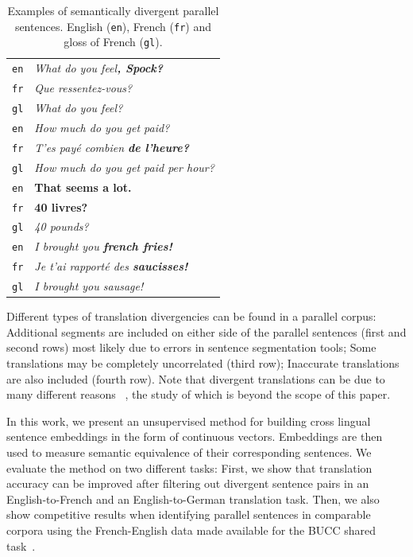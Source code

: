 \documentclass[11pt,a4paper]{article}
\begin{document}
\begin{table}[ht]
\small
\center
\begin{tabular}{ c|l }
  \hline  
  \texttt{en} & \it{What do you feel}\bf{, Spock}\it{?} \\
  \texttt{fr} & \it{Que ressentez-vous?} \\
  \texttt{gl} & {\small \it{What do you feel?}} \\
  \hline
  \texttt{en} & \it{How much do you get paid?} \\
  \texttt{fr} & \it{T'es pay\'e combien} \bf{de l'heure}\it{?} \\
  \texttt{gl} & {\small \it{How much do you get paid per hour?}} \\
  \hline  
  \texttt{en} &  \bf{That seems a lot.} \\
  \texttt{fr} & \bf{40 livres?} \\
  \texttt{gl} & {\small \it{40 pounds?}} \\
  \hline  
  \texttt{en} & \it{I brought you} \bf{french fries}\it{!} \\
  \texttt{fr} & \it{Je t'ai rapport\'e des} \bf{saucisses}\it{!} \\
  \texttt{gl} & {\small \it{I brought you sausage!}} \\
  \hline
\end{tabular}
\caption[Table caption text]{Examples of semantically divergent parallel sentences. English (\texttt{en}), French (\texttt{fr}) and gloss of French (\texttt{gl}).}
\label{tab:examples}
\end{table}

Different types of translation divergencies can be found in a parallel corpus:
Additional segments are included on either side of the parallel sentences (first and second rows) most likely due to errors in sentence segmentation tools;
Some translations may be completely uncorrelated (third row);
Inaccurate translations are also included (fourth row). 
Note that divergent translations can be due to many different reasons ~\cite{C14-1055}, the study of which is beyond the scope of this paper. 

In this work, we present an unsupervised method for building cross lingual sentence embeddings in the form of continuous vectors. 
Embeddings are then used to measure semantic equivalence of their corresponding sentences.
We evaluate the method on two different tasks:
First, we show that translation accuracy can be improved after filtering out divergent sentence pairs in an English-to-French and an English-to-German translation task.
Then, we also show competitive results when identifying parallel sentences in comparable corpora using the French-English data made available for the BUCC shared task~\cite{ZWEIGENBAUM18.12}.
\end{document}
